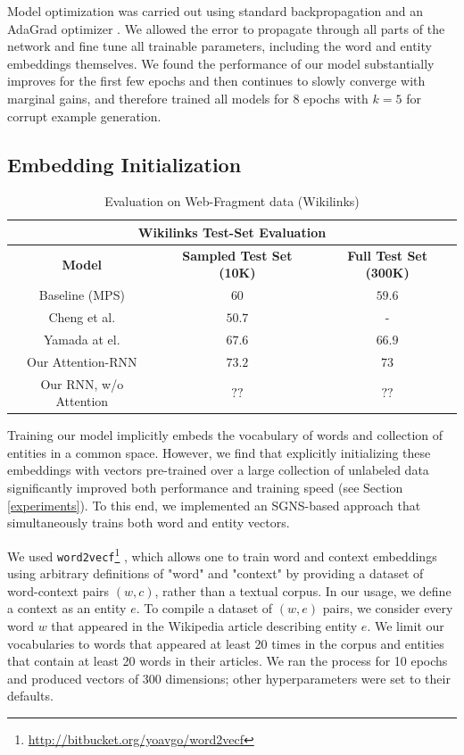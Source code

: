 \documentclass[11pt]{article}
\begin{document}
Model optimization was carried out using standard backpropagation and an AdaGrad optimizer \cite{duchi2011adaptive}. We allowed the error to propagate through all parts of the network and fine tune all trainable parameters, including the word and entity embeddings themselves. We found the performance of our model substantially improves for the first few epochs and then continues to slowly converge with marginal gains, and therefore trained all models for $8$ epochs with $k=5$ for corrupt example generation. 

\subsection{Embedding Initialization}

\begin{table}[t]
	\begin{center}
		\begin{tabular}{|c| c | c | }
			\hline \multicolumn{3}{|c|}{Wikilinks Test-Set Evaluation} \\
			\hline \bf Model               & \bf Sampled Test Set (10K)  & \bf Full Test Set (300K)  \\
			Baseline (MPS)                 & $60$   & $59.6$ \\
			Cheng et al.                   & $50.7$ & - \\
			Yamada at el.                  & $67.6$ & $66.9$ \\
			\hline
			Our Attention-RNN              & $73.2$ & $73$ \\
			Our RNN, w/o Attention         & $??$   & $??$ \\
			\hline
		\end{tabular}
	\end{center}
	\caption{\label{tab:wikilink} Evaluation on Web-Fragment data (Wikilinks)}
\end{table}

Training our model implicitly embeds the vocabulary of words and collection of entities in a common space. However, we find that explicitly initializing these embeddings with vectors pre-trained over a large collection of unlabeled data significantly improved both performance and training speed (see Section \ref{experiments}). To this end, we implemented an SGNS-based approach \cite{mikolov2013distributed} that simultaneously trains both word and entity vectors.

We used \texttt{word2vecf}\footnote{\url{http://bitbucket.org/yoavgo/word2vecf}} \cite{levy2014dependency}, which allows one to train word and context embeddings using arbitrary definitions of "word" and "context" by providing a dataset of word-context pairs $(w,c)$, rather than a textual corpus. In our usage, we define a context as an entity $e$. To compile a dataset of $(w,e)$ pairs, we consider every word $w$ that appeared in the Wikipedia article describing entity $e$. We limit our vocabularies to words that appeared at least 20 times in the corpus and entities that contain at least 20 words in their articles. We ran the process for 10 epochs and produced vectors of 300 dimensions; other hyperparameters were set to their defaults.
\end{document}
